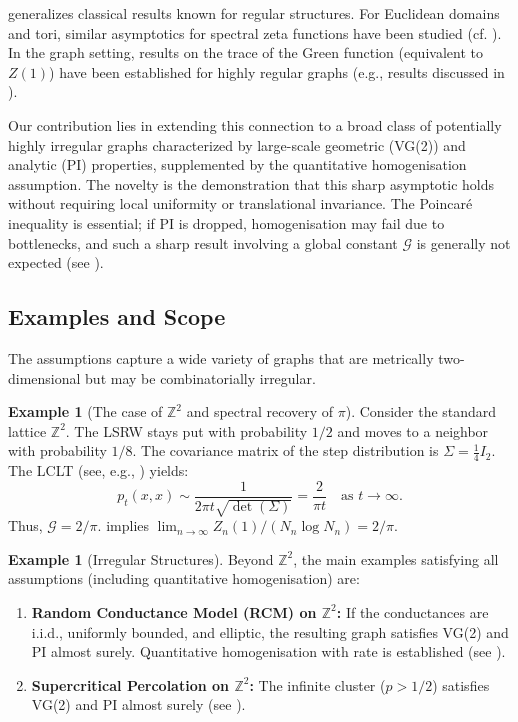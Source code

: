 \documentclass{article}
\numberwithin{equation}{section}
\theoremstyle{definition}
\newtheorem{example}[theorem]{Example}
\theoremstyle{remark}
\newcommand{\cG}{\mathcal{G}}
\begin{document}
 generalizes classical results known for regular structures. For Euclidean domains and tori, similar asymptotics for spectral zeta functions have been studied (cf. \cite{Colin85, Frank10}). In the graph setting, results on the trace of the Green function (equivalent to $Z(1)$) have been established for highly regular graphs (e.g., results discussed in \cite{MizunoTachikawa03, Kaimanovich00}).

Our contribution lies in extending this connection to a broad class of potentially highly irregular graphs characterized by large-scale geometric (VG(2)) and analytic (PI) properties, supplemented by the quantitative homogenisation assumption. The novelty is the demonstration that this sharp asymptotic holds without requiring local uniformity or translational invariance. The Poincaré inequality is essential; if PI is dropped, homogenisation may fail due to bottlenecks, and such a sharp result involving a global constant $\cG$ is generally not expected (see ).

\subsection{Examples and Scope}
The assumptions capture a wide variety of graphs that are metrically two-dimensional but may be combinatorially irregular.

\begin{example}[The case of $\mathbb{Z}^2$ and spectral recovery of $\pi$]\label{rem:pi2}
Consider the standard lattice $\mathbb{Z}^2$. The LSRW stays put with probability $1/2$ and moves to a neighbor with probability $1/8$. The covariance matrix of the step distribution is $\Sigma = \frac{1}{4} I_2$. The LCLT (see, e.g., \cite[Ch. 2]{LawlerLimic10}) yields:
\[
p_t(x,x) \sim \frac{1}{2\pi t \sqrt{\det(\Sigma)}} = \frac{2}{\pi t} \quad \text{as } t \to \infty.
\]
Thus, $\cG = 2/\pi$.  implies $\lim_{n \to \infty} Z_n(1) / (N_n \log N_n) = 2/\pi$.
\end{example}

\begin{example}[Irregular Structures]\label{ex:irregular}
Beyond $\mathbb{Z}^2$, the main examples satisfying all assumptions (including quantitative homogenisation) are:
\begin{enumerate}
    \item \textbf{Random Conductance Model (RCM) on $\mathbb{Z}^2$:} If the conductances are i.i.d., uniformly bounded, and elliptic, the resulting graph satisfies VG(2) and PI almost surely. Quantitative homogenisation with rate is established (see \cite{Biskup11}).
    \item \textbf{Supercritical Percolation on $\mathbb{Z}^2$:} The infinite cluster ($p>1/2$) satisfies VG(2) and PI almost surely (see \cite{Barlow04}).
\end{enumerate}
\end{example}
\end{document}
